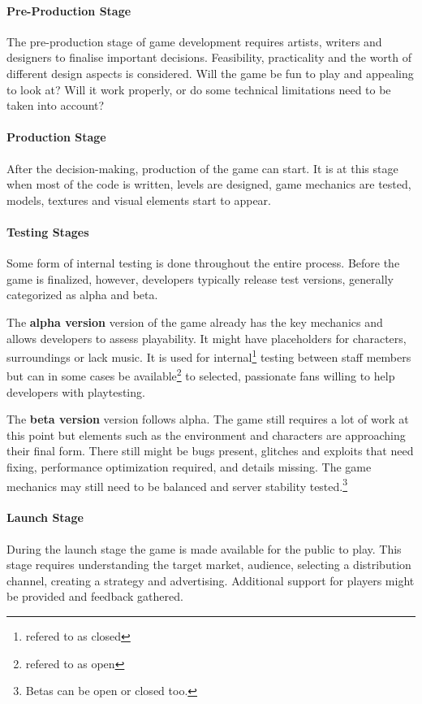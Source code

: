 \paragraph{Pre-Production Stage}
The pre-production stage of game development requires artists, writers and designers to finalise important decisions. Feasibility, practicality and the worth of different design aspects is considered. Will the game be fun to play and appealing to look at? Will it work properly, or do some technical limitations need to be taken into account?
\cite{bramble_7-stages, rocket_6-stages}

\paragraph{Production Stage}
After the decision-making, production of the game can start. It is at this stage when most of the code is written, levels are designed, game mechanics are tested, models, textures and visual elements start to appear.
\cite{bramble_7-stages, rocket_6-stages}

\paragraph{Testing Stages}
Some form of internal testing is done throughout the entire process. Before the game is finalized, however, developers typically release test versions, generally categorized as alpha and beta.

The \textbf{alpha version} version of the game already has the key mechanics and allows developers to assess playability. It might have placeholders for characters, surroundings or lack music. It is used for internal\footnote{refered to as closed} testing between staff members but can in some cases be available\footnote{refered to as open} to selected, passionate fans willing to help developers with playtesting.
\cite{bramble_7-stages, rocket_6-stages, esler_viable-games}

The \textbf{beta version} version follows alpha. The game still requires a lot of work at this point but elements such as the environment and characters are approaching their final form. There still might be bugs present, glitches and exploits that need fixing, performance optimization required, and details missing. The game mechanics may still need to be balanced and server stability tested.\footnote{Betas can be open or closed too.}
\cite{bramble_7-stages, rocket_6-stages, esler_viable-games}

\paragraph{Launch Stage}
During the launch stage the game is made available for the public to play. This stage requires understanding the target market, audience, selecting a distribution channel, creating a strategy and advertising. Additional support for players might be provided and feedback gathered.
\cite{bramble_7-stages, rocket_6-stages, esler_viable-games}

